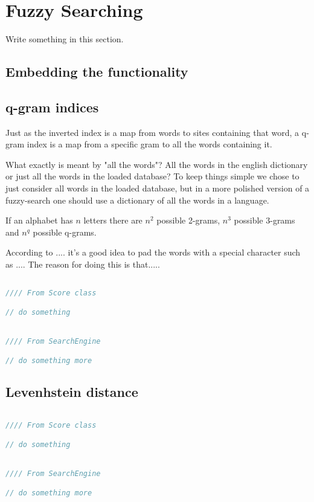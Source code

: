 \section{Fuzzy Searching}
Write something in this section.


\subsection{Embedding the functionality}




\subsection{q-gram indices}
Just as the inverted index is a map from words to sites containing that word, a q-gram index is a map from a specific gram to all the words containing it. 

What exactly is meant by "all the words"? All the words in the english dictionary or just all the words in the loaded database? To keep things simple we chose to just consider all words in the loaded database, but in a more polished version of a fuzzy-search one should use a dictionary of all the words in a language. 

If an alphabet has \(n\) letters there are \(n^2\) possible 2-grams, \(n^3\) possible 3-grams and \(n^q\) possible q-grams.

According to ....  it's a good idea to pad the words with a special character such as .... The reason for doing this is that.....


\begin{lstlisting}[language=Java, caption=This is a code example., label=lst:2-gram]

//// From Score class 

// do something	


//// From SearchEngine 

// do something more

\end{lstlisting}


\subsection{Levenhstein distance}


\begin{lstlisting}[language=Java, caption=This is a code example., label=lst:2-gram]

//// From Score class 

// do something	


//// From SearchEngine 

// do something more

\end{lstlisting}


